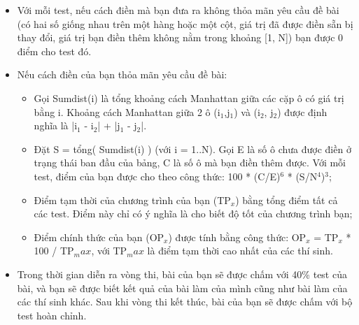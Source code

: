 \begin{itemize}
	\item Với mỗi test, nếu cách điền mà bạn đưa ra không thỏa mãn yêu cầu đề bài (có hai số giống nhau trên một hàng hoặc một cột, giá trị đã được điền sẵn bị thay đổi, giá trị bạn điền thêm không nằm trong khoảng [1, N]) bạn được 0 điểm cho test đó.
	\item Nếu cách điền của bạn thỏa mãn yêu cầu đề bài: 

\begin{itemize}
	\item Gọi Sumdist(i) là tổng khoảng cách Manhattan giữa các cặp ô có giá trị bằng i. Khoảng cách Manhattan giữa 2 ô (i$_1$,j$_1$) và (i$_2$, j$_2$) được định nghĩa là |i$_1$ - i$_2$| + |j$_1$ - j$_2$|. 
	\item Đặt S = tổng( Sumdist(i) ) (với i = 1..N). Gọi E là số ô chưa được điền ở trạng thái ban đầu của bảng, C là số ô mà bạn điền thêm được. Với mỗi test, điểm của bạn được cho theo công thức: 100 * (C/E)$^6$ * (S/N$^4$)$^3$;
	\item Điểm tạm thời của chương trình của bạn (TP$_x$) bằng tổng điểm tất cả các test. Điểm này chỉ có ý nghĩa là cho biết độ tốt của chương trình bạn; 
	\item Điểm chính thức của bạn (OP$_x$) được tính bằng công thức: OP$_x$ = TP$_x$ * 100 / TP$_max $, với TP$_max$ là điểm tạm thời cao nhất của các thí sinh. 
\end{itemize}
	\item Trong thời gian diễn ra vòng thi, bài của bạn sẽ được chấm với 40\% test của bài, và bạn sẽ được biết kết quả của bài làm của mình cũng như bài làm của các thí sinh khác. Sau khi vòng thi kết thúc, bài của bạn sẽ được chấm với bộ test hoàn chỉnh. 
\end{itemize}
